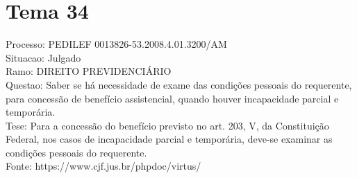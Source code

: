 \documentclass[12pt]{article}
\begin{document}
\section*{Tema 34}
Processo: PEDILEF 0013826-53.2008.4.01.3200/AM\\
Situacao: Julgado\\
Ramo: DIREITO PREVIDENCIÁRIO\\
Questao: Saber se há necessidade de exame das condições pessoais do requerente, para concessão de benefício assistencial, quando houver incapacidade parcial e temporária.\\
Tese: Para a concessão do benefício previsto no art. 203, V, da Constituição Federal, nos casos de incapacidade parcial e temporária, deve-se examinar as condições pessoais do requerente.\\
Fonte: https://www.cjf.jus.br/phpdoc/virtus/
\end{document}
